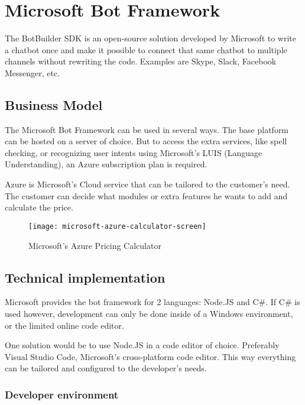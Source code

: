\chapter{Microsoft Bot Framework}

The BotBuilder SDK is an open-source solution developed by Microsoft to write a chatbot once and make it possible to connect that same chatbot to multiple channels without rewriting the code. Examples are Skype, Slack, Facebook Messenger, etc.

\section{Business Model}

The Microsoft Bot Framework can be used in several ways. The base platform can be hosted on a server of choice. But to access the extra services, like spell checking, or recognizing user intents using Microsoft's LUIS (Language Understanding), an Azure subscription plan is required.

Azure is Microsoft's Cloud service that can be tailored to the customer's need. The customer can decide what modules or extra features he wants to add and calculate the price.

\begin{figure}[ht]
	\centering
	\texttt{[image: microsoft-azure-calculator-screen]}\label{fig:microsoft-azure-calculator-screen}
	\caption{Microsoft's Azure Pricing Calculator~\cite{azure-pricing-calculator}}
\end{figure}

\section{Technical implementation}

Microsoft provides the bot framework for 2 languages: Node.JS\cite{node-js} and C\#. If C\# is used however, development can only be done inside of a Windows environment, or the limited online code editor.

One solution would be to use Node.JS in a code editor of choice. Preferably Visual Studio Code\cite{visual-studio-code}, Microsoft's cross-platform code editor. This way everything can be tailored and configured to the developer's needs.

\subsection{Developer environment}

